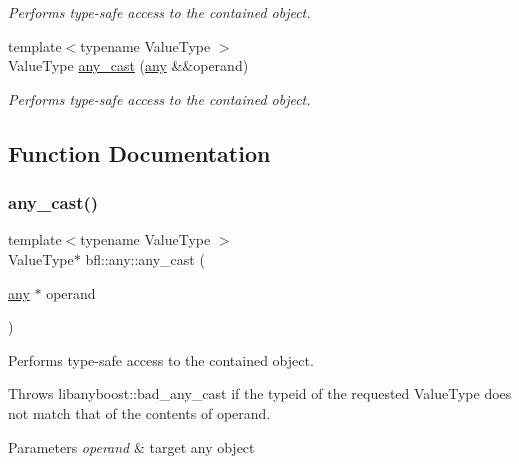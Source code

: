 \begin{DoxyCompactItemize}
\begin{DoxyCompactList}\small\item\em Performs type-\/safe access to the contained object. \end{DoxyCompactList}\item 
{\footnotesize template$<$typename Value\+Type $>$ }\\Value\+Type \mbox{\hyperlink{namespacebfl_1_1any_ad3725007dbc3ccb1af3f821dc5a3afd3}{any\+\_\+cast}} (\mbox{\hyperlink{classbfl_1_1any_1_1any}{any}} \&\&operand)
\begin{DoxyCompactList}\small\item\em Performs type-\/safe access to the contained object. \end{DoxyCompactList}\end{DoxyCompactItemize}


\subsection{Function Documentation}
\mbox{\label{namespacebfl_1_1any_a4ecb51ad57b3fa935cabdc0dcdcb4df1}} 
\subsubsection{\texorpdfstring{any\+\_\+cast()}{any\_cast()}\hspace{0.1cm}{\footnotesize\ttfamily [1/5]}}
{\footnotesize\ttfamily template$<$typename Value\+Type $>$ \\
Value\+Type$\ast$ bfl\+::any\+::any\+\_\+cast (\begin{DoxyParamCaption}\item[{\mbox{\hyperlink{classbfl_1_1any_1_1any}{any}} $\ast$}]{operand }\end{DoxyParamCaption})\hspace{0.3cm}{\ttfamily [noexcept]}}



Performs type-\/safe access to the contained object. 

Throws libanyboost\+::bad\+\_\+any\+\_\+cast if the typeid of the requested Value\+Type does not match that of the contents of operand.


\begin{DoxyParams}{Parameters}
{\em operand} & target any object \\
\hline
\end{DoxyParams}


